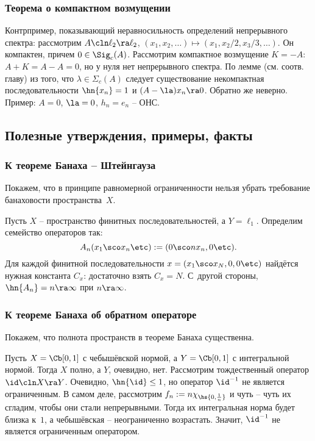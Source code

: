 \documentclass[a4paper]{article}
\begin{document}
\subsubsection{Теорема о компактном возмущении}

Контрпример, показывающий неравносильность определений непрерывного спектра: рассмотрим $A\cln \ell_2\ra \ell_2$,
$(x_1,x_2,\ldots)\mapsto(x_1,x_2/2,x_3/3,\ldots)$. Он компактен, причем $0 \in \Sig_c(A)$.
Рассмотрим компактное возмущение $K=-A$: $A+K=A-A=0$, но у нуля нет
непрерывного спектра. По лемме (см. соотв. главу) из того, что
$\lambda\in\Sigma_c(A)$
следует
существование некомпактная последовательности $\hn{x_n} = 1$ и $(A-\la)x_n\ra 0$.
Обратно же неверно. Пример: $A=0$, $\la=0$, $h_n=e_n$ -- ОНС.

\subsection{Полезные утверждения, примеры, факты}

\subsubsection{К теореме Банаха -- Штейнгауза}

Покажем, что в принципе равномерной ограниченности нельзя убрать требование банаховости пространства~$X$.

\begin{ex}
Пусть $X$ -- пространство финитных последовательностей, а $Y = \ell_1$.
Определим семейство операторов так:
$$A_n(x_1\sco x_n\etc) := (0\sco nx_n,0\etc).$$
Для каждой финитной последовательности $x = (x_1\sco x_N, 0,0\etc)$ найдётся нужная константа $C_x$:
достаточно взять $C_x = N$.
С~другой стороны, $\hn{A_n} = n \ra \infty$ при $n \ra \infty$.
\end{ex}


\subsubsection{К теореме Банаха об обратном операторе}

Покажем, что полнота пространств в теореме Банаха существенна.

\begin{ex}
Пусть $X = \Cb[0,1]$ с чебышёвской нормой, а $Y = \Cb[0,1]$ с интегральной нормой.
Тогда $X$ полно, а $Y$, очевидно, нет. Рассмотрим тождественный оператор $\id\cln X \ra Y$.
Очевидно, $\hn{\id} \le 1$, но оператор $\id^{-1}$ не является ограниченным.
В самом деле, рассмотрим $f_n := n \chi_{\hs{0,\frac1n}}$ и чуть -- чуть их сгладим,
чтобы они стали непрерывными. Тогда их интегральная норма будет близка к~$1$, а чебышёвская --
неограниченно возрастать. Значит, $\id^{-1}$ не является ограниченным оператором.
\end{ex}
\end{document}
